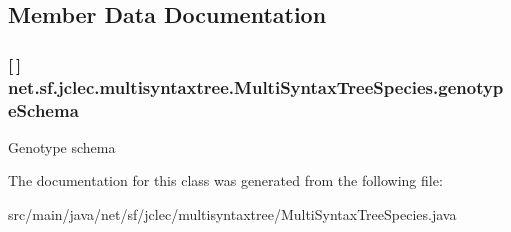 \subsection{Member Data Documentation}
\hypertarget{classnet_1_1sf_1_1jclec_1_1multisyntaxtree_1_1_multi_syntax_tree_species_ab77d36e8b8e41e0ba1adb7edc41f71f9}{
\subsubsection[{genotype\-Schema}]{ \mbox{[}$\,$\mbox{]} net.\-sf.\-jclec.\-multisyntaxtree.\-Multi\-Syntax\-Tree\-Species.\-genotype\-Schema\hspace{0.3cm}{\ttfamily [protected]}}}\label{classnet_1_1sf_1_1jclec_1_1multisyntaxtree_1_1_multi_syntax_tree_species_ab77d36e8b8e41e0ba1adb7edc41f71f9}
Genotype schema 

The documentation for this class was generated from the following file\-:\begin{DoxyCompactItemize}
\item 
src/main/java/net/sf/jclec/multisyntaxtree/Multi\-Syntax\-Tree\-Species.\-java\end{DoxyCompactItemize}
